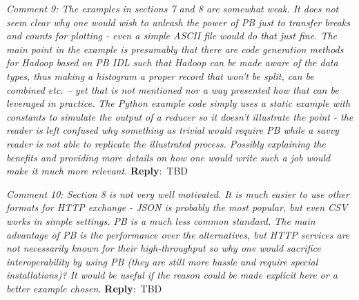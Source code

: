 \documentclass[10pt]{article}
\newcommand{\pointRaised}[2]{\smallskip %
  \textsl{{\fontseries{b}\selectfont #1}: #2}\newline}
\newcommand{\reply}[1]{\textbf{Reply}:\ #1 \smallskip } %
\begin{document}
\pointRaised{Comment 9}{The examples in sections 7 and 8 are somewhat weak. It does not seem 
  clear why one would wish to unleash the power of PB just to transfer 
  breaks and counts for plotting - even a simple ASCII file would do that
  just fine. The main point in the example is presumably that there are 
  code generation methods for Hadoop based on PB IDL such that Hadoop can
  be made aware of the data types, thus making a histogram a proper record 
  that won't be split, can be combined etc. -- yet that is not mentioned 
  nor a way presented how that can be leveraged in practice. The Python 
  example code simply uses a static example with constants to simulate the 
  output of a reducer so it doesn't illustrate the point - the reader is 
  left confused why something as trivial would require PB while a savvy 
  reader is not able to replicate the illustrated process. Possibly 
  explaining the benefits and providing more details on how one would 
  write such a job would make it much more relevant.}
\reply{TBD}


\pointRaised{Comment 10}{Section 8 is not very well motivated. It is much easier to use other 
  formats for HTTP exchange - JSON is probably the most popular, but even
  CSV works in simple settings. PB is a much less common standard. The 
  main advantage of PB is the performance over the alternatives, but HTTP
  services are not necessarily known for their high-throughput so why one
  would sacrifice interoperability by using PB (they are still more hassle 
  and require special installations)? It would be useful if the reason 
  could be made explicit here or a better example chosen.}
\reply{TBD}
\end{document}
